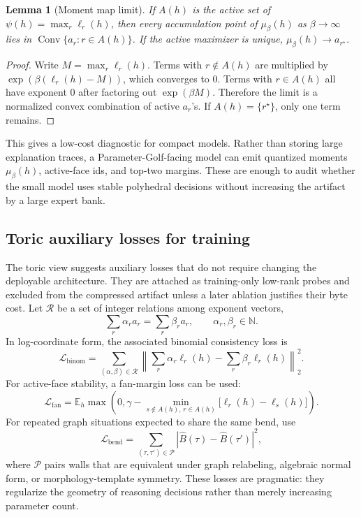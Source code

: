 \documentclass[11pt]{article}
\theoremstyle{definition}
\theoremstyle{plain}
\newtheorem{lemma}[definition]{Lemma}
\theoremstyle{remark}
\numberwithin{equation}{section}
\newcommand{\N}{\mathbb{N}}
\newcommand{\Eop}{\mathbb{E}}
\newcommand{\Conv}{\operatorname{Conv}}
\newcommand{\abs}[1]{\left\lvert #1\right\rvert}
\begin{document}
\begin{lemma}[Moment map limit]
If $A(h)$ is the active set of $\psi(h)=\max_r\ell_r(h)$, then every accumulation point of $\mu_\beta(h)$ as $\beta\to\infty$ lies in $\Conv\{a_r:r\in A(h)\}$.  If the active maximizer is unique, $\mu_\beta(h)\to a_{r^\star}$.
\end{lemma}

\begin{proof}
Write $M=\max_r\ell_r(h)$.  Terms with $r\notin A(h)$ are multiplied by $\exp(\beta(\ell_r(h)-M))$, which converges to $0$.  Terms with $r\in A(h)$ all have exponent $0$ after factoring out $\exp(\beta M)$.  Therefore the limit is a normalized convex combination of active $a_r$'s.  If $A(h)=\{r^\star\}$, only one term remains.
\end{proof}

This gives a low-cost diagnostic for compact models.  Rather than storing large explanation traces, a Parameter-Golf-facing model can emit quantized moments $\mu_\beta(h)$, active-face ids, and top-two margins.  These are enough to audit whether the small model uses stable polyhedral decisions without increasing the artifact by a large expert bank.

\subsection{Toric auxiliary losses for training}

The toric view suggests auxiliary losses that do not require changing the deployable architecture.  They are attached as training-only low-rank probes and excluded from the compressed artifact unless a later ablation justifies their byte cost.  Let $\mathcal R$ be a set of integer relations among exponent vectors,
\begin{equation}
  \sum_r \alpha_r a_r=\sum_r \beta_r a_r,
  \qquad \alpha_r,\beta_r\in\N.
\end{equation}
In log-coordinate form, the associated binomial consistency loss is
\begin{equation}
  \mathcal L_{\mathrm{binom}}
  =
  \sum_{(\alpha,\beta)\in\mathcal R}
  \left\|
    \sum_r\alpha_r \ell_r(h)-\sum_r\beta_r \ell_r(h)
  \right\|_2^2.
\end{equation}
For active-face stability, a fan-margin loss can be used:
\begin{equation}
  \mathcal L_{\mathrm{fan}}
  =
  \Eop_h\max\left(0,\gamma-
  \min_{s\notin A(h),\,r\in A(h)}
  \bigl[\ell_r(h)-\ell_s(h)\bigr]\right).
\end{equation}
For repeated graph situations expected to share the same bend, use
\begin{equation}
  \mathcal L_{\mathrm{bend}}
  =
  \sum_{(\tau,\tau')\in\mathcal P}
  \abs{\widehat B(\tau)-\widehat B(\tau')}^2,
\end{equation}
where $\mathcal P$ pairs walls that are equivalent under graph relabeling, algebraic normal form, or morphology-template symmetry.  These losses are pragmatic: they regularize the geometry of reasoning decisions rather than merely increasing parameter count.
\end{document}
